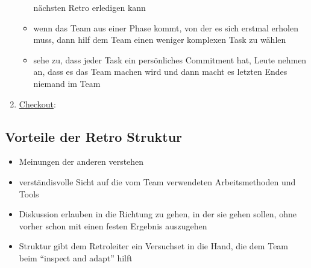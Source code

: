 \begin{enumerate}
\begin{Beschreibungfett}[Zweck]
\begin{itemize}
            nächsten Retro erledigen kann
          \item wenn das Team aus einer Phase kommt, von der es sich erstmal erholen muss, dann
            hilf dem Team einen weniger komplexen Task zu wählen
          \item sehe zu, dass jeder Task ein persönliches Commitment hat, Leute nehmen an, dass es
            das Team machen wird und dann macht es letzten Endes niemand im Team
        \end{itemize}
    \end{Beschreibungfett}
  \item \uline{Checkout}:
\end{enumerate}


\subsection{Vorteile der Retro Struktur}
\begin{itemize}
  \item Meinungen der anderen verstehen
  \item verständisvolle Sicht auf die vom Team verwendeten Arbeitsmethoden und Tools
  \item Diskussion erlauben in die Richtung zu gehen, in der sie gehen sollen, ohne vorher
    schon mit einen festen Ergebnis auszugehen
  \item Struktur gibt dem Retroleiter ein Versuchset in die Hand, die dem Team beim \enquote{inspect and adapt} hilft
\end{itemize}


